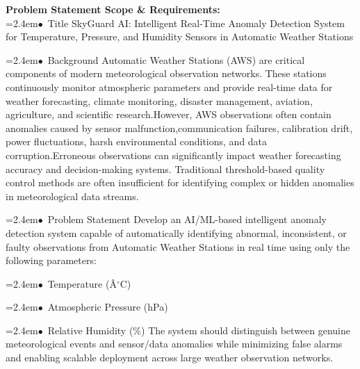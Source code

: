 \documentclass[10pt,a4paper]{article}
\begin{document}
\begin{tcolorbox}[pscard, title={"\textbf{SIH26073} \quad $\vert$ \quad AI/ML-Based Intelligent Anomaly Detection for Automatic Weather Stations (A...}]
\textbf{\color{sihnavy}Problem Statement Scope \& Requirements:}\\[0.15cm]
\noindent\hspace*{1.2em}\hangindent=2.4em\textcolor{sihblue}{$\bullet$}~\small Title SkyGuard AI: Intelligent Real-Time Anomaly Detection System for Temperature, Pressure, and Humidity Sensors in Automatic Weather Stations\par\vspace{0.05cm}
\noindent\hspace*{1.2em}\hangindent=2.4em\textcolor{sihblue}{$\bullet$}~\small Background Automatic Weather Stations (AWS) are critical components of modern meteorological observation networks. These stations continuously monitor atmospheric parameters and provide real-time data for weather forecasting, climate monitoring, disaster management, aviation, agriculture, and scientific research.However, AWS observations often contain anomalies caused by sensor malfunction,communication failures, calibration drift, power fluctuations, harsh environmental conditions, and data corruption.Erroneous observations can significantly impact weather forecasting accuracy and decision-making systems. Traditional threshold-based quality control methods are often insufficient for identifying complex or hidden anomalies in meteorological data streams.\par\vspace{0.05cm}
\noindent\hspace*{1.2em}\hangindent=2.4em\textcolor{sihblue}{$\bullet$}~\small Problem Statement Develop an AI/ML-based intelligent anomaly detection system capable of automatically identifying abnormal, inconsistent, or faulty observations from Automatic Weather Stations in real time using only the following parameters:\par\vspace{0.05cm}
\noindent\hspace*{1.2em}\hangindent=2.4em\textcolor{sihblue}{$\bullet$}~\small Temperature (Â$^\circ$C)\par\vspace{0.05cm}
\noindent\hspace*{1.2em}\hangindent=2.4em\textcolor{sihblue}{$\bullet$}~\small Atmospheric Pressure (hPa)\par\vspace{0.05cm}
\noindent\hspace*{1.2em}\hangindent=2.4em\textcolor{sihblue}{$\bullet$}~\small Relative Humidity (\%) The system should distinguish between genuine meteorological events and sensor/data anomalies while minimizing false alarms and enabling scalable deployment across large weather observation networks.\par\vspace{0.05cm}

\end{tcolorbox}
\end{document}
